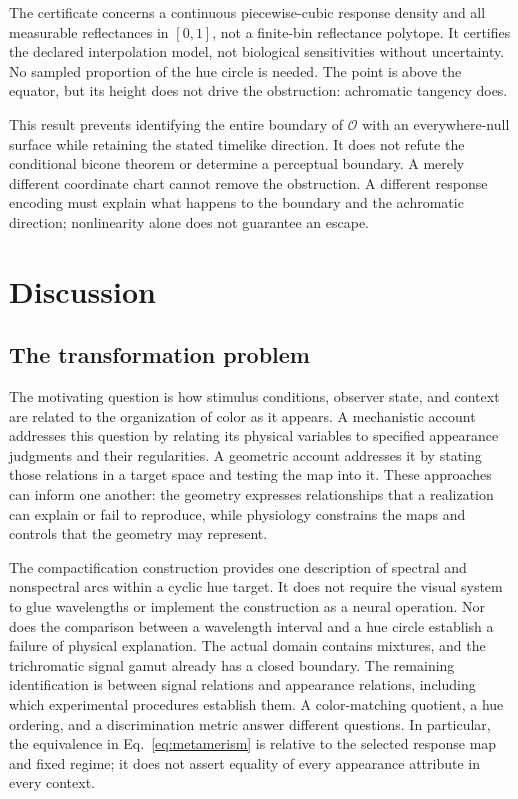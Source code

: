 \documentclass[11pt,letterpaper]{article}
\theoremstyle{plain}
\begin{document}
The certificate concerns a continuous piecewise-cubic response density and all measurable reflectances in $[0,1]$, not a finite-bin reflectance polytope. It certifies the declared interpolation model, not biological sensitivities without uncertainty. No sampled proportion of the hue circle is needed. The point is above the equator, but its height does not drive the obstruction: achromatic tangency does.

This result prevents identifying the entire boundary of $\mathcal O$ with an everywhere-null surface while retaining the stated timelike direction. It does not refute the conditional bicone theorem or determine a perceptual boundary. A merely different coordinate chart cannot remove the obstruction. A different response encoding must explain what happens to the boundary and the achromatic direction; nonlinearity alone does not guarantee an escape.

\section{Discussion}
\label{sec:discussion}
\subsection{The transformation problem}
The motivating question is how stimulus conditions, observer state, and context are related to the organization of color as it appears. A mechanistic account addresses this question by relating its physical variables to specified appearance judgments and their regularities. A geometric account addresses it by stating those relations in a target space and testing the map into it. These approaches can inform one another: the geometry expresses relationships that a realization can explain or fail to reproduce, while physiology constrains the maps and controls that the geometry may represent.

The compactification construction provides one description of spectral and nonspectral arcs within a cyclic hue target. It does not require the visual system to glue wavelengths or implement the construction as a neural operation. Nor does the comparison between a wavelength interval and a hue circle establish a failure of physical explanation. The actual domain contains mixtures, and the trichromatic signal gamut already has a closed boundary. The remaining identification is between signal relations and appearance relations, including which experimental procedures establish them. A color-matching quotient, a hue ordering, and a discrimination metric answer different questions. In particular, the equivalence in Eq.~\eqref{eq:metamerism} is relative to the selected response map and fixed regime; it does not assert equality of every appearance attribute in every context.
\end{document}
